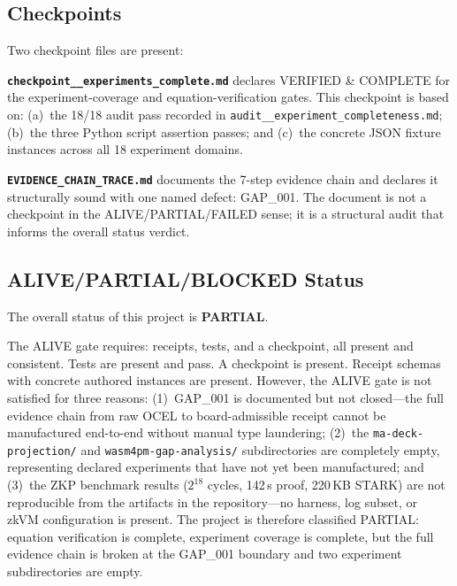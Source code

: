 \subsection{Checkpoints}
\label{sec:experiments-core-evidence-checkpoints}

Two checkpoint files are present:

\textbf{\texttt{checkpoint\_\_experiments\_complete.md}} declares VERIFIED \& COMPLETE
for the experiment-coverage and equation-verification gates. This checkpoint is
based on: (a)~the 18/18 audit pass recorded in \texttt{audit\_\_experiment\_completeness.md};
(b)~the three Python script assertion passes; and (c)~the concrete JSON fixture
instances across all 18 experiment domains.

\textbf{\texttt{EVIDENCE\_CHAIN\_TRACE.md}} documents the 7-step evidence chain
and declares it structurally sound with one named defect: GAP\_001. The document
is not a checkpoint in the ALIVE/PARTIAL/FAILED sense; it is a structural audit
that informs the overall status verdict.

\subsection{ALIVE/PARTIAL/BLOCKED Status}
\label{sec:experiments-core-evidence-status}

The overall status of this project is \textbf{PARTIAL}.

The ALIVE gate requires: receipts, tests, and a checkpoint, all present and
consistent. Tests are present and pass. A checkpoint is present. Receipt schemas
with concrete authored instances are present. However, the ALIVE gate is not
satisfied for three reasons: (1)~GAP\_001 is documented but not closed---the
full evidence chain from raw OCEL to board-admissible receipt cannot be manufactured
end-to-end without manual type laundering; (2)~the \texttt{ma-deck-projection/}
and \texttt{wasm4pm-gap-analysis/} subdirectories are completely empty, representing
declared experiments that have not yet been manufactured; and (3)~the ZKP benchmark
results ($2^{18}$ cycles, 142\,s proof, 220\,KB STARK) are not reproducible from
the artifacts in the repository---no harness, log subset, or zkVM configuration
is present. The project is therefore classified PARTIAL: equation verification is
complete, experiment coverage is complete, but the full evidence chain is broken
at the GAP\_001 boundary and two experiment subdirectories are empty.
